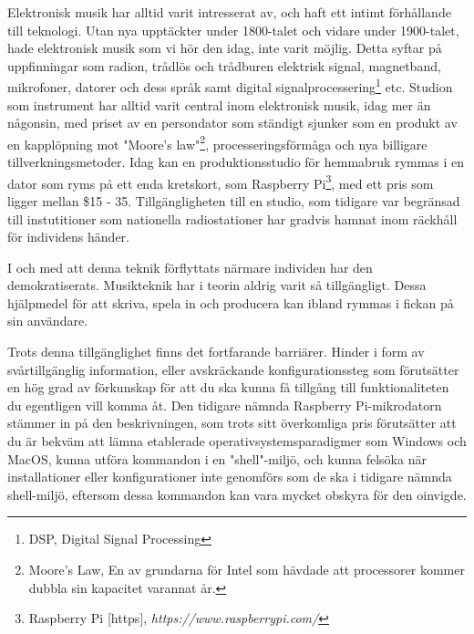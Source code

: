 \documentclass{article}
\begin{document}
Elektronisk musik har alltid varit intresserat av, och haft ett intimt förhållande till teknologi. Utan nya
upptäckter under 1800-talet och vidare under 1900-talet, hade elektronisk musik som vi hör den idag, inte
varit möjlig. Detta syftar på uppfinningar som radion, trådlös och trådburen elektrisk signal,
magnetband, mikrofoner, datorer och dess språk samt digital signalprocessering\footnote{DSP, Digital Signal
Processing} etc. Studion som instrument 
har alltid varit central inom elektronisk musik, idag mer än
någonsin, med priset av en persondator som ständigt sjunker som en produkt av en kapplöpning mot "Moore's
law"\footnote{Moore's Law, En av grundarna för Intel som hävdade att processorer kommer dubbla sin kapacitet
varannat år.}, processeringsförmåga och nya billigare tillverkningsmetoder. Idag kan
en produktionsstudio för hemmabruk rymmas i en dator som ryms på ett enda kretskort, som Raspberry
Pi\footnote{Raspberry Pi [https], \emph{https://www.raspberrypi.com/}}, med ett pris som ligger mellan \$15
- 35. Tillgängligheten till en studio, som tidigare var begränsad till instutitioner som nationella
radiostationer har gradvis hamnat inom räckhåll för individens händer.

I och med att denna teknik förflyttats närmare individen har den demokratiserats. Musikteknik har i teorin
aldrig varit så tillgängligt. Dessa hjälpmedel för att skriva, spela in och producera kan ibland rymmas i
fickan på sin användare.

Trots denna tillgänglighet finns det fortfarande barriärer. Hinder i form av svårtillgänglig information,
eller avskräckande konfigurationssteg som förutsätter en hög grad av förkunskap för att du ska kunna få
tillgång till funktionaliteten du egentligen vill komma åt. Den tidigare nämnda
Raspberry Pi-mikrodatorn stämmer in på den beskrivningen, som trots sitt överkomliga pris förutsätter att du
är bekväm att lämna etablerade operativsystemsparadigmer som Windows och MacOS, kunna utföra kommandon i en
"shell"-miljö, och kunna felsöka när installationer eller konfigurationer inte genomförs som de ska i tidigare
nämnda shell-miljö, eftersom dessa kommandon kan vara mycket obskyra för den oinvigde.
	
\end{document}
